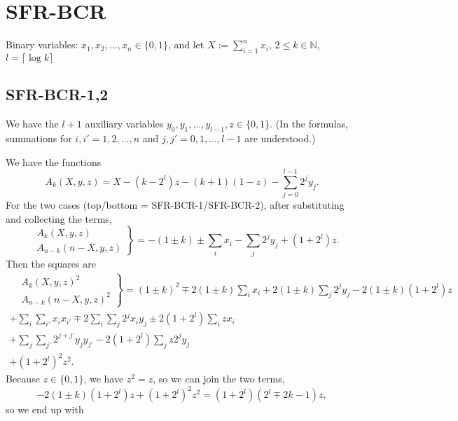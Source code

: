 \documentclass[a4paper,11pt]{article}
\newcommand{\ceil}[1]{\lceil #1 \rceil}
\begin{document}
\section{SFR-BCR}

Binary variables: $x_1,x_2,\dots,x_n\in\{0,1\}$, 
and let $X:=\sum_{i=1}^n x_i$, $2\leq k\in\mathbb{N}$, $l = \ceil{\log k}$

\subsection{SFR-BCR-1,2}
We have the $l+1$ auxiliary variables $y_0,y_1,\dots,y_{l-1},z\in\{0,1\}$.
(In the formulas, summations for $i,i' = 1,2,\dots,n$ and $j,j' = 0,1,\dots,l-1$ are understood.)

We have the functions
\begin{equation}
\label{eq:Ak}
A_k(X,y,z) = X - (k-2^l)z - (k+1)(1-z) - \sum_{j=0}^{l-1}2^jy_j.
\end{equation}
For the  two cases
(top/bottom = SFR-BCR-1/SFR-BCR-2),
after substituting and collecting the terms,
\begin{equation}
\label{eq:Ak12}
\left.\begin{aligned}
&A_k(X,y,z) \\
&A_{n-k}({n-X},y,z) 
\end{aligned}\right\}
= -(1\pm k) \pm \sum_i x_i - \sum_j 2^jy_j + (1+2^l)z.
\end{equation}
Then the squares are
\begin{equation}
\label{eq:Ak12sq}
\begin{split}
\left.\begin{aligned}
&A_k(X,y,z)^2 \\
&A_{n-k}({n-X},y,z)^2 
\end{aligned}\right\}
= (1\pm k)^2 \mp2(1\pm k)\sum_i x_i +2(1\pm k)\sum_j 2^jy_j -2(1\pm k)(1+2^l)z & \\
+ \sum_i\sum_{i'} x_ix_{i'} \mp2\sum_i\sum_j 2^jx_iy_j \pm2 (1+2^l)\sum_i zx_i & \\
+ \sum_j\sum_{j'} 2^{j+j'}y_jy_{j'} - 2(1+2^l)\sum_j z 2^jy_j & \\
+ (1+2^l)^2z^2. &
\end{split}
\end{equation}
Because $z\in\{0,1\}$, we have $z^2=z$, so we can join the two terms,
\begin{equation}
-2(1\pm k)(1+2^l)z + (1+2^l)^2z^2 = (1+2^l)(2^l\mp2k-1)z,
\end{equation}
so we end up with
\end{document}
